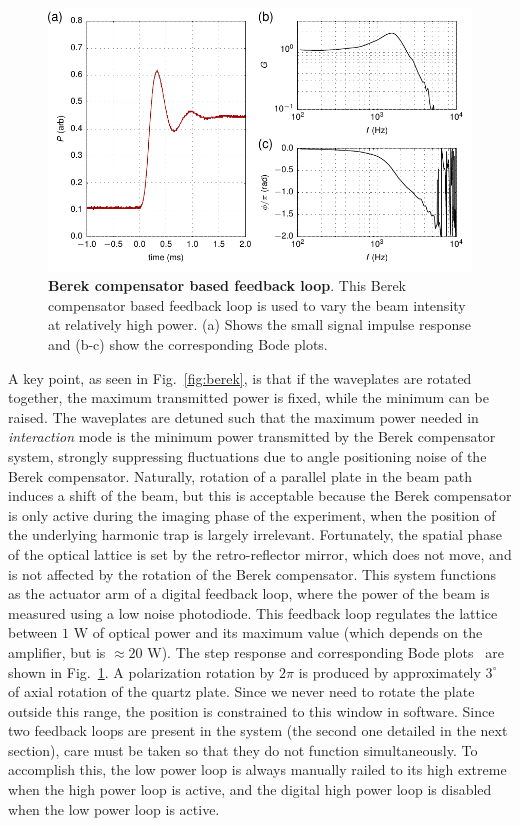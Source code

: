 \documentclass[twocolumn,aps,pra,showpacs,preprintnumbers,bibnotes]{revtex4-1}
\begin{document}
\begin{figure}
  \begin{center}
    \includegraphics[width=\columnwidth]{fig/step_response.pdf}
    \caption{\textbf{Berek compensator based feedback loop}. This Berek compensator based feedback loop is used to vary the beam intensity at relatively high power. (a) Shows the small signal impulse response and (b-c) show the corresponding Bode plots.}\label{fig:berek_step_response}
  \end{center}
\end{figure}
A key point, as seen in Fig.~\ref{fig:berek}, is that if the waveplates are rotated together, the maximum transmitted power is fixed, while the minimum can be raised.
The waveplates are detuned such that the maximum power needed in \textit{interaction} mode is the minimum power transmitted by the Berek compensator system, strongly suppressing fluctuations due to angle positioning noise of the Berek compensator.
Naturally, rotation of a parallel plate in the beam path induces a shift of the beam, but this is acceptable because the Berek compensator is only active during the imaging phase of the experiment, when the position of the underlying harmonic trap is largely irrelevant.
Fortunately, the spatial phase of the optical lattice is set by the retro-reflector mirror, which does not move, and is not affected by the rotation of the Berek compensator.
This system functions as the actuator arm of a digital feedback loop, where the power of the beam is measured using a low noise photodiode. This feedback loop regulates the lattice between $1$ W of optical power and its maximum value (which depends on the amplifier, but is $\approx20$ W).
The step response and corresponding Bode plots~\cite{Bechhoefer2005} are shown in Fig.~\ref{fig:berek_step_response}.
A polarization rotation by $2 \pi$ is produced by approximately $3^\circ$ of axial rotation of the quartz plate.
Since we never need to rotate the plate outside this range, the position is constrained to this window in software.
Since two feedback loops are present in the system (the second one detailed in the next section), care must be taken so that they do not function simultaneously.
To accomplish this, the low power loop is always manually railed to its high extreme when the high power loop is active, and the digital high power loop is disabled when the low power loop is active.
\end{document}
